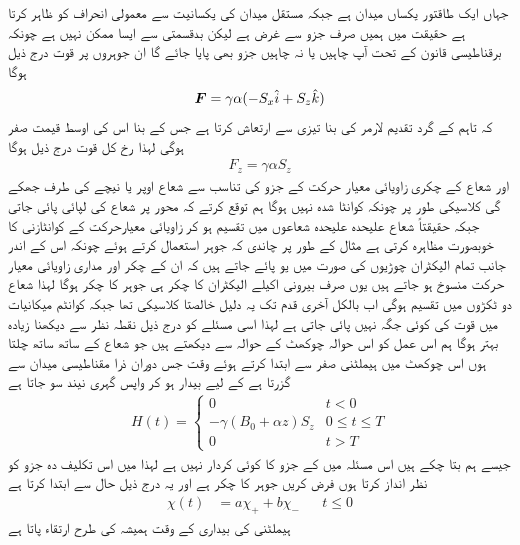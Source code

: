 جہاں  ایک طاقتور یکساں میدان ہے جبکہ مستقل  میدان کی یکسانیت سے معمولی انحراف کو ظاہر کرتا ہے حقیقت میں ہمیں صرف  جزو سے غرض ہے لیکن بدقسمتی سے ایسا ممکن نہیں ہے چونکہ برقناطیسی قانون  کے تحت آپ چاہیں یا نہ چاہیں  جزو بھی پایا جائے گا ان جوہروں پر قوت درج ذیل ہوگا 
\begin{align*}
{\ensuremath{{\boldsymbol{F}}}} = \gamma \alpha (- S_x \hat{i} + S_z \hat{k})
\end{align*}
کہ تاہم  کے گرد تقدیم لارمر کی بنا  تیزی سے ارتعاش کرتا ہے جس کے بنا اس کی اوسط قیمت صفر ہوگی لہذا  رخ كل قوت درج ذیل ہوگا 
\begin{align}
F_z = \gamma \alpha S_z
\end{align}
اور شعاع کے چکری زاویائی معیار حرکت کے  جزو کی تناسب سے شعاع اوپر یا نیچے کی طرف جھکے گی کلاسیکی طور پر چونکہ  کوانٹا شدہ نہیں ہوگا ہم توقع کرتے کہ  محور پر شعاع کی لپائی پائی جاتی جبکہ حقیقتاً شعاع  علیحدہ علیحدہ  شعاعوں میں تقسیم ہو کر زاویائی معیارحرکت کے کوانٹازنی کا خوبصورت مظاہرہ کرتی ہے مثال کے طور پر چاندی کہ جوہر استعمال کرتے ہوئے چونکہ اس کے اندر جانب تمام الیکٹران چوڑیوں کی صورت میں یو پائے جاتے ہیں کہ ان کے چکر اور مداری زاویائی معیار حرکت منسوخ ہو جاتے ہیں یوں صرف بیرونی اکیلے الیکٹران کا چکر  ہی جوہر کا چکر ہوگا لہذا شعاع دو ٹکڑوں میں تقسیم ہوگی اب بالکل آخری قدم تک یہ دلیل خالصتا کلاسیکی تھا جبکہ کوانٹم میکانیات میں قوت کی کوئی جگہ نہیں پائی جاتی ہے لہذا اسی مسئلے کو درج ذیل نقطہ نظر سے دیکھنا زیادہ بہتر ہوگا ہم اس عمل کو اس حوالہ چوکھٹ کے حوالہ سے دیکھتے ہیں جو شعاع کے ساتھ ساتھ چلتا ہوں اس چوکھٹ میں ہیملٹنی صفر سے ابتدا کرتے ہوئے وقت  جس دوران ذرا مقناطیسی میدان سے گزرتا ہے کے لیے بیدار ہو کر واپس گہری نیند سو جاتا ہے 
\begin{align}
H (t) = 
\begin{cases}
0 & t < 0 \\
- \gamma (B_0 + \alpha z) S_z & 0 \le t \le T \\
0 & t > T
\end{cases}
\end{align}
جیسے ہم بتا چکے ہیں اس مسئلہ میں  کے  جزو کا کوئی کردار نہیں ہے لہذا میں اس تکلیف دہ جزو کو نظر انداز کرتا ہوں فرض کریں جوہر کا چکر  ہے اور یہ درج ذیل حال سے ابتدا کرتا ہے 
\begin{align*}
\chi (t) &= a \chi_{+} + b\chi_{-} && t\le 0
\end{align*}
ہیملٹنی کی بیداری کے وقت  ہمیشہ کی طرح ارتقاء پاتا ہے 
